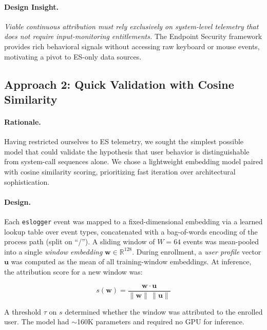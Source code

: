 \documentclass[letterpaper,twocolumn,10pt]{article}
\begin{document}
\paragraph{Design Insight.}
\emph{Viable continuous attribution must rely exclusively on
system-level telemetry that does not require input-monitoring
entitlements.}  The Endpoint Security framework provides rich
behavioral signals without accessing raw keyboard or mouse events,
motivating a pivot to ES-only data sources.


\subsection{Approach 2: Quick Validation with Cosine Similarity}
\label{sec:a2}

\paragraph{Rationale.}
Having restricted ourselves to ES telemetry, we sought the simplest
possible model that could validate the hypothesis that user behavior
is distinguishable from system-call sequences alone.  We chose a
lightweight embedding model paired with cosine similarity scoring,
prioritizing fast iteration over architectural sophistication.

\paragraph{Design.}
Each \texttt{eslogger} event was mapped to a fixed-dimensional
embedding via a learned lookup table over event types, concatenated
with a bag-of-words encoding of the process path (split on ``/'').
A sliding window of $W=64$ events was mean-pooled into a single
\emph{window embedding} $\mathbf{w} \in \mathbb{R}^{128}$.  During
enrollment, a \emph{user profile} vector $\mathbf{u}$ was computed
as the mean of all training-window embeddings.  At inference, the
attribution score for a new window was:

\begin{equation}
  s(\mathbf{w}) = \frac{\mathbf{w} \cdot \mathbf{u}}
    {\|\mathbf{w}\| \, \|\mathbf{u}\|}
  \label{eq:cosine}
\end{equation}

A threshold $\tau$ on $s$ determined whether the window was
attributed to the enrolled user.  The model had $\sim$160K
parameters and required no GPU for inference.
\end{document}

